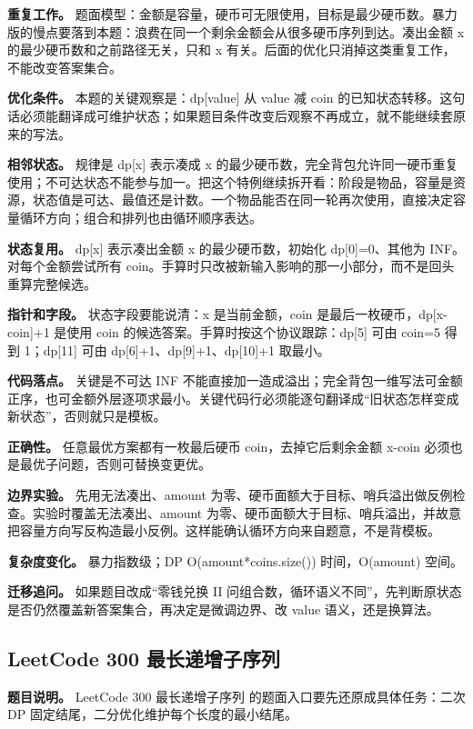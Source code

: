 \textbf{重复工作。} 题面模型：金额是容量，硬币可无限使用，目标是最少硬币数。暴力版的慢点要落到本题：浪费在同一个剩余金额会从很多硬币序列到达。凑出金额 x 的最少硬币数和之前路径无关，只和 x 有关。后面的优化只消掉这类重复工作，不能改变答案集合。

\textbf{优化条件。} 本题的关键观察是：dp[value] 从 value 减 coin 的已知状态转移。这句话必须能翻译成可维护状态；如果题目条件改变后观察不再成立，就不能继续套原来的写法。

\textbf{相邻状态。} 规律是 dp[x] 表示凑成 x 的最少硬币数，完全背包允许同一硬币重复使用；不可达状态不能参与加一。把这个特例继续拆开看：阶段是物品，容量是资源，状态值是可达、最值还是计数。一个物品能否在同一轮再次使用，直接决定容量循环方向；组合和排列也由循环顺序表达。

\textbf{状态复用。} dp[x] 表示凑出金额 x 的最少硬币数，初始化 dp[0]=0、其他为 INF。对每个金额尝试所有 coin。手算时只改被新输入影响的那一小部分，而不是回头重算完整候选。

\textbf{指针和字段。} 状态字段要能说清：x 是当前金额，coin 是最后一枚硬币，dp[x-coin]+1 是使用 coin 的候选答案。手算时按这个协议跟踪：dp[5] 可由 coin=5 得到 1；dp[11] 可由 dp[6]+1、dp[9]+1、dp[10]+1 取最小。

\textbf{代码落点。} 关键是不可达 INF 不能直接加一造成溢出；完全背包一维写法可金额正序，也可金额外层逐项求最小。关键代码行必须能逐句翻译成“旧状态怎样变成新状态”，否则就只是模板。

\textbf{正确性。} 任意最优方案都有一枚最后硬币 coin，去掉它后剩余金额 x-coin 必须也是最优子问题，否则可替换变更优。

\textbf{边界实验。} 先用无法凑出、amount 为零、硬币面额大于目标、哨兵溢出做反例检查。实验时覆盖无法凑出、amount 为零、硬币面额大于目标、哨兵溢出，并故意把容量方向写反构造最小反例。这样能确认循环方向来自题意，不是背模板。

\textbf{复杂度变化。} 暴力指数级；DP O(amount*coins.size()) 时间，O(amount) 空间。

\textbf{迁移追问。} 如果题目改成“零钱兑换 II 问组合数，循环语义不同”，先判断原状态是否仍然覆盖新答案集合，再决定是微调边界、改 value 语义，还是换算法。

\subsection{LeetCode 300 最长递增子序列}

\textbf{题目说明。} LeetCode 300 最长递增子序列 的题面入口要先还原成具体任务：二次 DP 固定结尾，二分优化维护每个长度的最小结尾。

